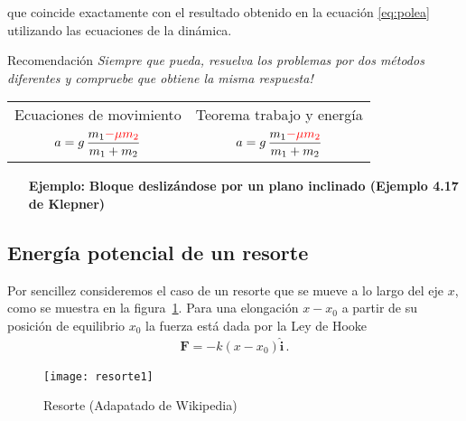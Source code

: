 \noindent
que coincide exactamente con el resultado obtenido en la ecuación \eqref{eq:polea} utilizando las ecuaciones de la dinámica. 

\begin{frame}
  \begin{block}{Recomendación}
    \emph{Siempre que pueda, resuelva los problemas por dos métodos diferentes y compruebe que obtiene la misma respuesta!}
    \begin{center}
          \begin{tabular}{cc}
      Ecuaciones de movimiento & Teorema trabajo y energía\\
      $\displaystyle a=g\,\frac{m_1{\color{red}-\mu m_2}}{m_1+m_2}$&
      $\displaystyle a=g\,\frac{m_1{\color{red}-\mu m_2}}{m_1+m_2}$\\
    \end{tabular}
    \end{center}
  \end{block}
\end{frame}

\begin{inprogress}
  \begin{itemize}
  \item[\textbf{Ejemplo:}] \textbf{Bloque deslizándose por un plano
      inclinado (Ejemplo 4.17 de Klepner)}\\
  \end{itemize}
\end{inprogress}


\subsection{Energía potencial de un resorte}
Por sencillez consideremos el caso de un resorte que se mueve a lo largo del eje $x$, como se muestra en la figura~\ref{fig:resorte}. Para una elongación $x-x_0$ a partir de su posición de equilibrio $x_0$ la fuerza está dada por la Ley de Hooke
\begin{align}
  \mathbf{F}=-k(x-x_0)\hat{\mathbf{i}}\,.
\end{align}
\begin{frame}
  \begin{figure}
    \centering
{\texttt{[image: resorte1]}}
    \caption{Resorte (Adapatado de Wikipedia)}
    \label{fig:resorte}
  \end{figure}
\end{frame}

